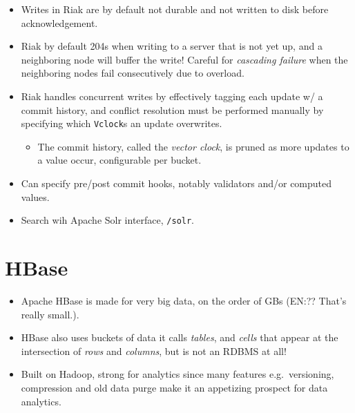 \documentclass[10pt]{article}
\begin{document}
\begin{itemize}
\begin{itemize}
        \end{itemize}
    \item Writes in Riak are by default not durable and not written to disk
        before acknowledgement.
    \item Riak by default 204s when writing to a server that is not yet up, and
        a neighboring node will buffer the write! Careful for \emph{cascading
        failure} when the neighboring nodes fail consecutively due to overload.
    \item Riak handles concurrent writes by effectively tagging each update w/ a
        commit history, and conflict resolution must be performed manually by
        specifying which \lstinline{Vclock}s an update overwrites.
        \begin{itemize}
            \item The commit history, called the \emph{vector clock}, is pruned
                as more updates to a value occur, configurable per bucket.
        \end{itemize}
    \item Can specify pre/post commit hooks, notably validators and/or computed
        values.
    \item Search wih Apache Solr interface, \lstinline{/solr}.
\end{itemize}

\section{HBase}

\begin{itemize}
    \item Apache HBase is made for very big data, on the order of GBs (EN:\@??
        That's really small.).
    \item HBase also uses buckets of data it calls \emph{tables}, and
        \emph{cells} that appear at the intersection of \emph{rows} and
        \emph{columns}, but is not an RDBMS at all!
    \item Built on Hadoop, strong for analytics since many features e.g.\
        versioning, compression and old data purge make it an appetizing
        prospect for data analytics.
\end{itemize}
\end{document}
